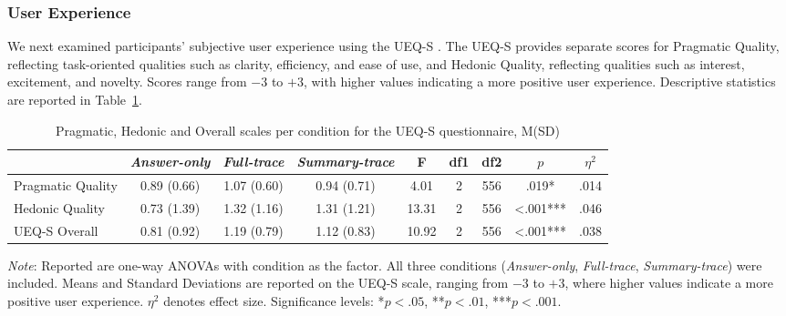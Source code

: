\documentclass[manuscript, anonymous=false,authorversion,review=false]{acmart}
\begin{document}
\subsubsection{User Experience}
We next examined participants' subjective user experience using the UEQ-S \cite{alberola2018creation}. The UEQ-S provides separate scores for Pragmatic Quality, reflecting task-oriented qualities such as clarity, efficiency, and ease of use, and Hedonic Quality, reflecting qualities such as interest, excitement, and novelty. Scores range from $-3$ to $+3$, with higher values indicating a more positive user experience. Descriptive statistics are reported in Table~\ref{tab:ueqs}.

\begin{table}[!htp]
\centering
\caption{Pragmatic, Hedonic and Overall scales per condition for the UEQ-S questionnaire, M(SD)}
\begin{tabular}{lcccccccc}
\hline
                  & \textit{Answer-only}    & \textit{Full-trace}   & \textit{Summary-trace}   & F & df1 & df2 & $p$     & $\eta^2$ \\ \hline
Pragmatic Quality & 0.89 (0.66) & 1.07 (0.60) & 0.94 (0.71) & 4.01 & 2& 556 & .019* & .014 \\
Hedonic Quality   & 0.73 (1.39) & 1.32 (1.16) & 1.31 (1.21) & 13.31 & 2& 556& <.001*** & .046 \\
UEQ-S Overall     & 0.81 (0.92) & 1.19 (0.79) & 1.12 (0.83)& 10.92 &2&556&<.001*** & .038 \\  
\hline
\end{tabular}

\raggedright \small \textit{Note}: Reported are one-way ANOVAs with condition as the factor. All three conditions (\textit{Answer-only}, \textit{Full-trace}, \textit{Summary-trace}) were included. Means and Standard Deviations are reported on the UEQ-S scale, ranging from $-3$ to $+3$, where higher values indicate a more positive user experience. $\eta^2$ denotes effect size.  Significance levels: *$p < .05$, **$p < .01$, ***$p < .001$.
\label{tab:ueqs}
\end{table}
\end{document}
